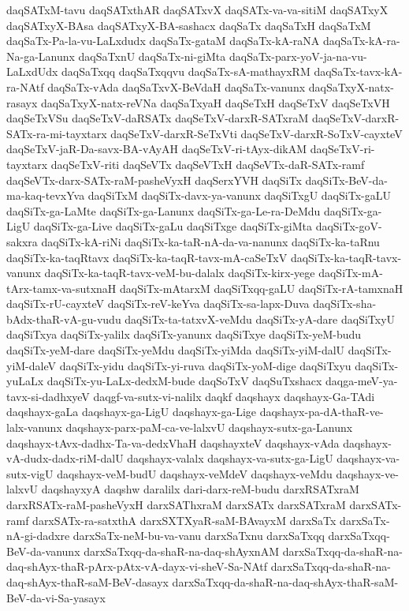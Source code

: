 {daqSATxM-tavu
daqSATxthAR
daqSATxvX
daqSATx-va-va-sitiM
daqSATxyX
daqSATxyX-BAsa
daqSATxyX-BA-sashacx
daqSaTx
daqSaTxH
daqSaTxM
daqSaTx-Pa-la-vu-LaLxdudx
daqSaTx-gataM
daqSaTx-kA-raNA
daqSaTx-kA-ra-Na-ga-Lanunx
daqSaTxnU
daqSaTx-ni-giMta
daqSaTx-parx-yoV-ja-na-vu-LaLxdUdx
daqSaTxqq
daqSaTxqqvu
daqSaTx-sA-mathayxRM
daqSaTx-tavx-kA-ra-NAtf
daqSaTx-vAda
daqSaTxvX-BeVdaH
daqSaTx-vanunx
daqSaTxyX-natx-rasayx
daqSaTxyX-natx-reVNa
daqSaTxyaH
daqSeTxH
daqSeTxV
daqSeTxVH
daqSeTxVSu
daqSeTxV-daRSATx
daqSeTxV-darxR-SATxraM
daqSeTxV-darxR-SATx-ra-mi-tayxtarx
daqSeTxV-darxR-SeTxVti
daqSeTxV-darxR-SoTxV-cayxteV
daqSeTxV-jaR-Da-savx-BA-vAyAH
daqSeTxV-ri-tAyx-dikAM
daqSeTxV-ri-tayxtarx
daqSeTxV-riti
daqSeVTx
daqSeVTxH
daqSeVTx-daR-SATx-ramf
daqSeVTx-darx-SATx-raM-pasheVyxH
daqSerxYVH
daqSiTx
daqSiTx-BeV-da-ma-kaq-tevxYva
daqSiTxM
daqSiTx-davx-ya-vanunx
daqSiTxgU
daqSiTx-gaLU
daqSiTx-ga-LaMte
daqSiTx-ga-Lanunx
daqSiTx-ga-Le-ra-DeMdu
daqSiTx-ga-LigU
daqSiTx-ga-Live
daqSiTx-gaLu
daqSiTxge
daqSiTx-giMta
daqSiTx-goV-sakxra
daqSiTx-kA-riNi
daqSiTx-ka-taR-nA-da-va-nanunx
daqSiTx-ka-taRnu
daqSiTx-ka-taqRtavx
daqSiTx-ka-taqR-tavx-mA-caSeTxV
daqSiTx-ka-taqR-tavx-vanunx
daqSiTx-ka-taqR-tavx-veM-bu-dalalx
daqSiTx-kirx-yege
daqSiTx-mA-tArx-tamx-va-sutxnaH
daqSiTx-mAtarxM
daqSiTxqq-gaLU
daqSiTx-rA-tamxnaH
daqSiTx-rU-cayxteV
daqSiTx-reV-keYva
daqSiTx-sa-lapx-Duva
daqSiTx-sha-bAdx-thaR-vA-gu-vudu
daqSiTx-ta-tatxvX-veMdu
daqSiTx-yA-dare
daqSiTxyU
daqSiTxya
daqSiTx-yalilx
daqSiTx-yanunx
daqSiTxye
daqSiTx-yeM-budu
daqSiTx-yeM-dare
daqSiTx-yeMdu
daqSiTx-yiMda
daqSiTx-yiM-dalU
daqSiTx-yiM-daleV
daqSiTx-yidu
daqSiTx-yi-ruva
daqSiTx-yoM-dige
daqSiTxyu
daqSiTx-yuLaLx
daqSiTx-yu-LaLx-dedxM-bude
daqSoTxV
daqSuTxshacx
daqga-meV-ya-tavx-si-dadhxyeV
daqgf-va-sutx-vi-nalilx
daqkf
daqshayx
daqshayx-Ga-TAdi
daqshayx-gaLa
daqshayx-ga-LigU
daqshayx-ga-Lige
daqshayx-pa-dA-thaR-ve-lalx-vanunx
daqshayx-parx-paM-ca-ve-lalxvU
daqshayx-sutx-ga-Lanunx
daqshayx-tAvx-dadhx-Ta-va-dedxVhaH
daqshayxteV
daqshayx-vAda
daqshayx-vA-dudx-dadx-riM-dalU
daqshayx-valalx
daqshayx-va-sutx-ga-LigU
daqshayx-va-sutx-vigU
daqshayx-veM-budU
daqshayx-veMdeV
daqshayx-veMdu
daqshayx-ve-lalxvU
daqshayxyA
daqshw
daralilx
dari-darx-reM-budu
darxRSATxraM
darxRSATx-raM-pasheVyxH
darxSAThxraM
darxSATx
darxSATxraM
darxSATx-ramf
darxSATx-ra-satxthA
darxSXTXyaR-saM-BAvayxM
darxSaTx
darxSaTx-nA-gi-dadxre
darxSaTx-neM-bu-va-vanu
darxSaTxnu
darxSaTxqq
darxSaTxqq-BeV-da-vanunx
darxSaTxqq-da-shaR-na-daq-shAyxnAM
darxSaTxqq-da-shaR-na-daq-shAyx-thaR-pArx-pAtx-vA-dayx-vi-sheV-Sa-NAtf
darxSaTxqq-da-shaR-na-daq-shAyx-thaR-saM-BeV-dasayx
darxSaTxqq-da-shaR-na-daq-shAyx-thaR-saM-BeV-da-vi-Sa-yasayx
}
